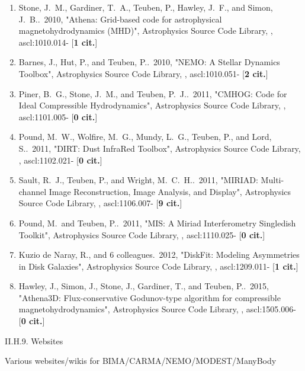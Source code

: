 \documentclass[11pt,letterpaper]{article}
\begin{document}
\begin{enumerate}[resume,label=\textbf{\arabic*}.]


\item  
Stone, J.~M., Gardiner, T.~A., Teuben, P., Hawley, J.~F., and Simon, 
J.~B..\  2010,  "Athena: Grid-based code for astrophysical 
magnetohydrodynamics (MHD)", Astrophysics Source Code Library,  , 
ascl:1010.014- [{\bf 1 cit.}]

\item  
Barnes, J., Hut, P., and Teuben, P..\  2010,  "NEMO: A Stellar Dynamics 
Toolbox", Astrophysics Source Code Library,  , ascl:1010.051- [{\bf 2 
cit.}] 

\item  
Piner, B.~G., Stone, J.~M., and Teuben, P.~J..\  2011,  "CMHOG: Code for 
Ideal Compressible Hydrodynamics", Astrophysics Source Code Library,  , 
ascl:1101.005- [{\bf 0 cit.}]

\item  
Pound, M.~W., Wolfire, M.~G., Mundy, L.~G., Teuben, P., and Lord, S..\  
2011,  "DIRT: Dust InfraRed Toolbox", Astrophysics Source Code Library,  , 
ascl:1102.021- [{\bf 0 cit.}] 
\item  
Sault, R.~J., Teuben, P., and Wright, M.~C.~H..\  2011,  "MIRIAD: 
Multi-channel Image Reconstruction, Image Analysis, and Display", 
Astrophysics Source Code Library,  , ascl:1106.007- [{\bf 9 cit.}] 
\item  
Pound, M.~and Teuben, P..\  2011,  "MIS: A Miriad Interferometry Singledish 
Toolkit", Astrophysics Source Code Library,  , ascl:1110.025- [{\bf 0 
cit.}] 
\item  
Kuzio de Naray, R., and 6 colleagues.\  2012,  "DiskFit: Modeling 
Asymmetries in Disk Galaxies", Astrophysics Source Code Library,  , 
ascl:1209.011- [{\bf 1 cit.}] 
\item  
Hawley, J., Simon, J., Stone, J., Gardiner, T., and Teuben, P..\  2015,  
"Athena3D: Flux-conservative Godunov-type algorithm for compressible 
magnetohydrodynamics", Astrophysics Source Code Library,  , ascl:1505.006- 
[{\bf 0 cit.}] 


  
\end{enumerate}



II.H.9. Websites

Various websites/wikis for BIMA/CARMA/NEMO/MODEST/ManyBody
\end{document}
